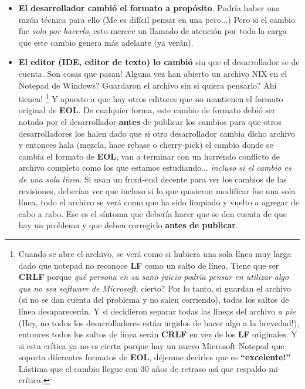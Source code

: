 \begin{itemize}
	\item {\bf El desarrollador cambió el formato a propósito}. Podría haber una razón técnica para ello (Me es difícil pensar en
	una pero...) Pero si el cambio fue {\it solo por hacerlo}, esto merece un llamado de atención por toda la carga que este cambio
	genera más adelante (ya verán).
	
	\item {\bf El editor (IDE, editor de texto) lo cambió} sin que el desarrollador se de cuenta. Son cosas que pasan! Alguna vez han
	abierto un archivo NIX en el Notepad de Windows? Guardaron el archivo sin si quiera pensarlo? Ahí tienen!
	\footnote{Cuando se abre el archivo, se verá como si hubiera una sola línea muy larga dado que notepad no reconoce {\bf LF}
	como un salto de línea. Tiene que ser {\bf CRLF} porque {\it qué persona en su sano juicio podría pensar en utilizar algo que
	no sea software de Microsoft}, cierto? Por lo tanto, si guardan el archivo (si no se dan cuenta del problema y no salen corriendo),
	todos los saltos de línea desaparecerán. Y si decidieron separar todas las lineas del archivo {\it a pie} (Hey, no todos los
	desarrolladores están urgidos de hacer algo a la brevedad!), entonces todos los saltos de línea serán {\bf CRLF} en vez de los
	{\bf LF} originales. Y si esta crítica ya no es cierta porque hay un nuevo Microsoft Notepad que soporta diferentes formatos de
	{\bf EOL}, déjenme decirles que es {\bf ``excelente!''} Lástima que el cambio llegue con 30 años de retraso así que respaldo
	mi crítica.}
	Y apuesto a que hay otros editores que no mantienen el formato original de {\bf EOL}. De cualquier forma, este cambio de formato
	debió ser notado por el desarrollador {\bf antes} de publicar los cambios para que otros desarrolladores los halen dado que si
	otro desarrollador cambia dicho archivo y entonces hala (mezcla, hace rebase o cherry-pick) el cambio donde se cambia el
	formato de {\bf EOL}, van a terminar con un horrendo conflicto de archivo completo como los que estamos estudiando... {\it incluso
	si el cambio es de una sola línea}. Si usan un front-end decente para ver los cambios de las revisiones, deberían ver que incluso
	si lo que quisieron modificar fue una sola línea, todo el archivo se verá como que ha sido limpiado y vuelto a agregar de cabo
	a rabo. Ese es el síntoma que debería hacer que se den cuenta de que hay un problema y que deben corregirlo {\bf antes de publicar}.
	

\end{itemize}
